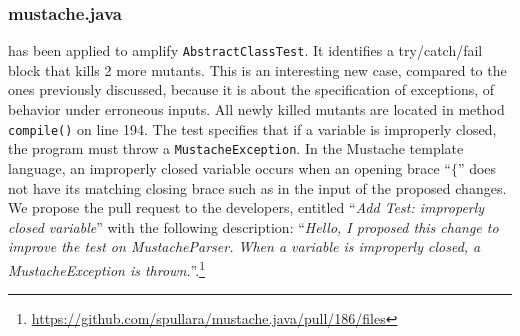 \subsubsection{mustache.java}


\dspot has been applied to amplify \texttt{AbstractClassTest}. 
It identifies a try/catch/fail block that kills 2 more mutants.
This is an interesting new case, compared to the ones previously discussed, because it is about the specification of exceptions, \ie of behavior under erroneous inputs.
All newly killed mutants are located in method \texttt{compile()} on line 194.
 The test specifies that if a variable is improperly closed, the program must throw a \texttt{MustacheException}. 
 In the Mustache template language, an improperly closed variable occurs when an opening brace ``$\{$'' does not have its matching closing brace such as in the input of the proposed changes. 
 We propose the pull request to the developers, entitled ``\emph{Add Test: improperly closed variable}'' with the following description: ``\emph{Hello, I proposed this change to improve the test on MustacheParser. When a variable is improperly closed, a MustacheException is thrown.}''.\footnote{\url{https://github.com/spullara/mustache.java/pull/186/files}}
